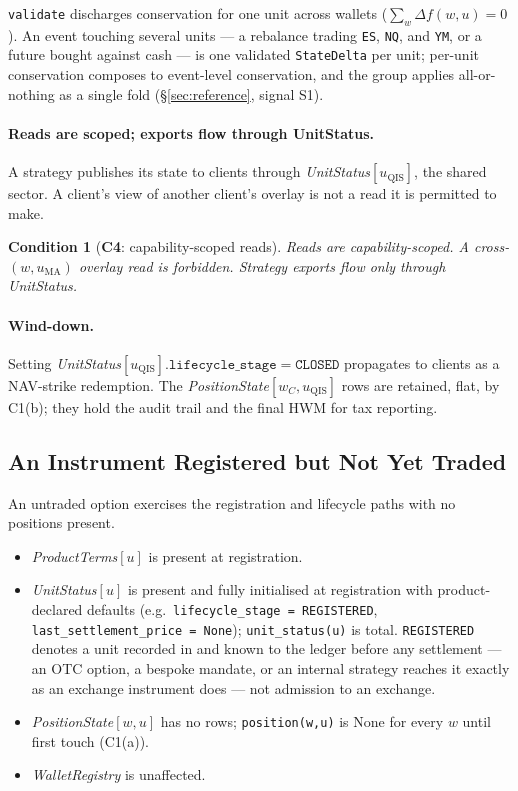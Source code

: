 \documentclass[11pt,a4paper]{article}
\newtheorem{condition}[definition]{Condition}
\begin{document}
\noindent \texttt{validate} discharges conservation for one unit across wallets
($\sum_{w}\Delta f(w,u)=0$). An event touching several units --- a rebalance trading
\texttt{ES}, \texttt{NQ}, and \texttt{YM}, or a future bought against cash --- is one
validated \texttt{StateDelta} per unit; per-unit conservation composes to event-level
conservation, and the group applies all-or-nothing as a single fold
(\S\ref{sec:reference}, signal S1).

\paragraph{Reads are scoped; exports flow through UnitStatus.}
A strategy publishes its state to clients through \emph{UnitStatus}$[u_{\mathrm{QIS}}]$, the
shared sector. A client's view of another client's overlay is not a read it is permitted to
make.

\begin{condition}[\textbf{C4}: capability-scoped reads]
Reads are capability-scoped. A cross-$(w,u_{\mathrm{MA}})$ overlay read is forbidden.
Strategy exports flow only through \emph{UnitStatus}.
\end{condition}

\paragraph{Wind-down.}
Setting \emph{UnitStatus}$[u_{\mathrm{QIS}}].\texttt{lifecycle\_stage}=\texttt{CLOSED}$
propagates to clients as a NAV-strike redemption. The
\emph{PositionState}$[w_C,u_{\mathrm{QIS}}]$ rows are retained, flat, by C1(b); they hold the
audit trail and the final HWM for tax reporting.

\subsection{An Instrument Registered but Not Yet Traded}
\label{sec:untraded}

An untraded option exercises the registration and lifecycle paths with no positions present.

\begin{itemize}[leftmargin=*]
\item \emph{ProductTerms}$[u]$ is present at registration.
\item \emph{UnitStatus}$[u]$ is present and fully initialised at registration with
product-declared defaults (e.g.\ \texttt{lifecycle\_stage = REGISTERED},
\texttt{last\_settlement\_price = None}); \texttt{unit\_status(u)} is total.
\texttt{REGISTERED} denotes a unit recorded in and known to the ledger before any
settlement --- an OTC option, a bespoke mandate, or an internal strategy reaches it
exactly as an exchange instrument does --- not admission to an exchange.
\item \emph{PositionState}$[w,u]$ has no rows; \texttt{position(w,u)} is $\mathrm{None}$ for
every $w$ until first touch (C1(a)).
\item \emph{WalletRegistry} is unaffected.
\end{itemize}
\end{document}
